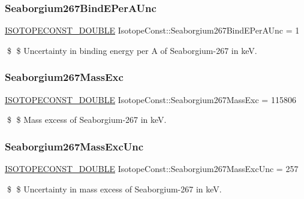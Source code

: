 \subsubsection{\texorpdfstring{Seaborgium267\+Bind\+E\+Per\+A\+Unc}{Seaborgium267BindEPerAUnc}}
{\footnotesize\ttfamily \mbox{\hyperlink{group___isotope_const-_macros_ga8f45a7272ce02c0b4c65c44636ed719a}{I\+S\+O\+T\+O\+P\+E\+C\+O\+N\+S\+T\+\_\+\+D\+O\+U\+B\+LE}} Isotope\+Const\+::\+Seaborgium267\+Bind\+E\+Per\+A\+Unc = 1}

\$ \$ Uncertainty in binding energy per A of Seaborgium-\/267 in keV. \mbox{\label{group___isotope_const-_seaborgium-_sg267_ga464ff34fe919614183f776cc604c38c3}} 
\subsubsection{\texorpdfstring{Seaborgium267\+Mass\+Exc}{Seaborgium267MassExc}}
{\footnotesize\ttfamily \mbox{\hyperlink{group___isotope_const-_macros_ga8f45a7272ce02c0b4c65c44636ed719a}{I\+S\+O\+T\+O\+P\+E\+C\+O\+N\+S\+T\+\_\+\+D\+O\+U\+B\+LE}} Isotope\+Const\+::\+Seaborgium267\+Mass\+Exc = 115806}

\$ \$ Mass excess of Seaborgium-\/267 in keV. \mbox{\label{group___isotope_const-_seaborgium-_sg267_ga889295c7d1a4a1913df0ce20c08566f8}} 
\subsubsection{\texorpdfstring{Seaborgium267\+Mass\+Exc\+Unc}{Seaborgium267MassExcUnc}}
{\footnotesize\ttfamily \mbox{\hyperlink{group___isotope_const-_macros_ga8f45a7272ce02c0b4c65c44636ed719a}{I\+S\+O\+T\+O\+P\+E\+C\+O\+N\+S\+T\+\_\+\+D\+O\+U\+B\+LE}} Isotope\+Const\+::\+Seaborgium267\+Mass\+Exc\+Unc = 257}

\$ \$ Uncertainty in mass excess of Seaborgium-\/267 in keV. \mbox{\label{group___isotope_const-_seaborgium-_sg267_ga7718e19805957801fa06c3c30d89f6ea}} 
